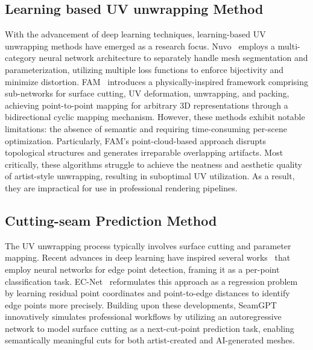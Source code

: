\documentclass{article}
\begin{document}
\subsection{Learning based UV unwrapping Method}
With the advancement of deep learning techniques, learning-based UV unwrapping methods have emerged as a research focus. Nuvo~\cite{srinivasan2024nuvo} employs a multi-category neural network architecture to separately handle mesh segmentation and parameterization, utilizing multiple loss functions to enforce bijectivity and minimize distortion. FAM~\cite{zhang2024flatten} introduces a physically-inspired framework comprising sub-networks for surface cutting, UV deformation, unwrapping, and packing, achieving point-to-point mapping for arbitrary 3D representations through a bidirectional cyclic mapping mechanism. However, these methods exhibit notable limitations: the absence of semantic and requiring time-consuming per-scene optimization. Particularly, FAM's point-cloud-based approach disrupts topological structures and generates irreparable overlapping artifacts. Most critically, these algorithms struggle to achieve the neatness and aesthetic quality of artist-style unwrapping, resulting in suboptimal UV utilization. As a result, they are impractical for use in professional rendering pipelines.

\subsection{Cutting-seam Prediction Method}
The UV unwrapping process typically involves surface cutting and parameter mapping. Recent advances in deep learning have inspired several works~\cite{wang2020pie,bazazian2021edc,himeur2021pcednet}  that employ neural networks for edge point detection, framing it as a per-point classification task. EC-Net~\cite{yu2018ec} reformulates this approach as a regression problem by learning residual point coordinates and point-to-edge distances to identify edge points more precisely. Building upon these developments, SeamGPT~\cite{li2025auto} innovatively simulates professional workflows by utilizing an autoregressive network to model surface cutting as a next-cut-point prediction task, enabling semantically meaningful cuts for both artist-created and AI-generated meshes.
\end{document}
